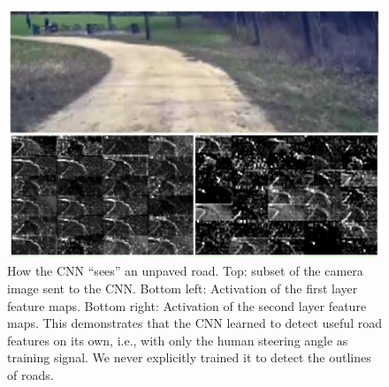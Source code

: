      \begin{figure}[h]
          \centering
          \includegraphics[keepaspectratio, scale=0.35] {images/bojarski_CNN.png}
          \captionsetup{justification=raggedright} %
          \caption{How the CNN ``sees'' an unpaved road. Top: subset of the camera image sent to the CNN. Bottom left: Activation of the first layer feature maps. Bottom right: Activation of the second layer feature maps. This demonstrates that the CNN learned to detect useful road features on its own, i.e., with only the human steering angle as training signal. We never explicitly trained it to detect the outlines of roads. \cite{bojarski}}
          \label{Fig:bojarski_CNN}
     \end{figure}
\newpage
